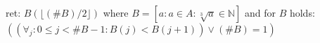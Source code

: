 \documentclass[a4paper,twoside,11pt]{article}
\begin{document}
ret: $B( \lfloor{(\#B)/2} \rfloor )$ where $B=[a : a \in A : \sqrt[3]{a} \in \mathbb{N}]$ and for $B$ holds:\\
$((\forall_j : 0 \leq j < \#B-1 : B(j) < B(j+1)) \vee (\#B)=1)$
\end{document}
